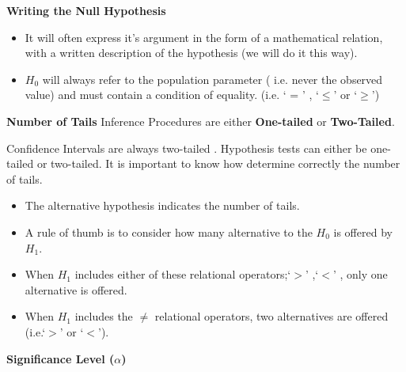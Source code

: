 \documentclass[a4]{beamer}
\begin{document}
{
\noindent \textbf{Writing the Null Hypothesis}
\begin{itemize}
\item It will often express it's argument in the form of a mathematical relation, with a written description of the hypothesis (we will do it this way).
\item $H_0$ will always refer to the population parameter ( i.e. never the observed value) and must contain a condition of equality. (i.e. ` = ' , `$ \leq$' or `$\geq$')
\end{itemize}
}


{
\noindent \textbf{Number of Tails}
Inference Procedures are either \textbf{One-tailed} or \textbf{Two-Tailed}.


 Confidence Intervals are always two-tailed . Hypothesis tests can either be one-tailed or two-tailed. It is important to know how determine correctly the number of tails.
\begin{itemize}
\item The alternative hypothesis indicates the number of tails.
\item A rule of thumb is to consider how many alternative to the $H_0$ is offered by $H_1$.
\item When $H_1$ includes either of these relational operators;`$>$' ,`$<$' , only one alternative is offered.
\item When $H_1$ includes the $\neq$ relational operators, two alternatives are offered (i.e.`$>$' or `$<$').
\end{itemize}
}



\noindent \textbf{Significance Level ($\alpha$)}
\end{document}
